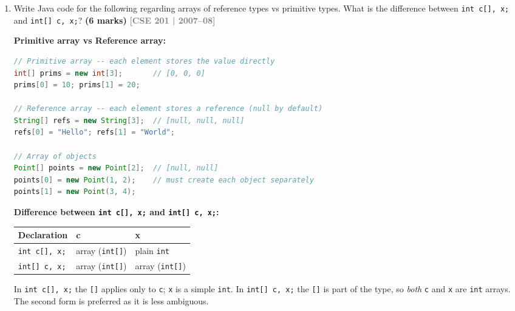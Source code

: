 \documentclass[12pt,a3paper]{article}
\newcommand{\yr}[1]{\hfill\textcolor{gray}{\small\textbf{[#1]}}}
\newcommand{\mk}[1]{\textcolor{orange!70!black}{\small\textbf{(#1 marks)}}}
\begin{document}
\begin{enumerate}
\item Write Java code for the following regarding arrays of reference types vs primitive types. What is the difference between \texttt{int c[], x;} and \texttt{int[] c, x;}? \mk{6}
\yr{CSE 201 | 2007--08}

\begin{tcolorbox}[enhanced,breakable,ansbox,
  colback=cC!4,colframe=cC,boxrule=0.8pt,arc=5pt,
  title={\textbf{Answer --- Primitive vs Reference Arrays and Declaration Syntax}},
  fonttitle=\bfseries\color{white},colbacktitle=cC]

\textbf{Primitive array vs Reference array:}
\begin{lstlisting}[language=Java]
// Primitive array -- each element stores the value directly
int[] prims = new int[3];       // [0, 0, 0]
prims[0] = 10; prims[1] = 20;

// Reference array -- each element stores a reference (null by default)
String[] refs = new String[3];  // [null, null, null]
refs[0] = "Hello"; refs[1] = "World";

// Array of objects
Point[] points = new Point[2];  // [null, null]
points[0] = new Point(1, 2);    // must create each object separately
points[1] = new Point(3, 4);
\end{lstlisting}

\medskip
\textbf{Difference between \texttt{int c[], x;} and \texttt{int[] c, x;}:}

\begin{center}
\small
\begin{tabular}{@{}lll@{}}
\toprule
\textbf{Declaration} & \textbf{c} & \textbf{x} \\
\midrule
\texttt{int c[], x;} & array (\texttt{int[]}) & plain \texttt{int} \\
\texttt{int[] c, x;} & array (\texttt{int[]}) & array (\texttt{int[]}) \\
\bottomrule
\end{tabular}
\end{center}

In \texttt{int c[], x;} the \texttt{[]} applies only to \texttt{c};
\texttt{x} is a simple \texttt{int}. In \texttt{int[] c, x;} the
\texttt{[]} is part of the type, so \emph{both} \texttt{c} and
\texttt{x} are \texttt{int} arrays. The second form is preferred as it
is less ambiguous.
\end{tcolorbox}


\end{enumerate}
\newpage
\end{document}
